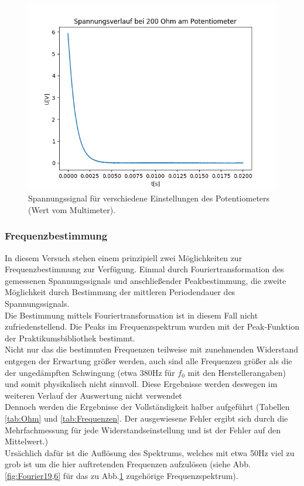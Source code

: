 \documentclass[12pt,a4paper]{article}
\begin{document}
\begin{figure}
\begin{center}
\includegraphics[scale=0.5]{Bilder/Spannungsverlauf200}
\end{center}
\caption[Spannungsverlauf]{Spannungssignal für verschiedene Einstellungen des Potentiometers (Wert vom Multimeter).}
\label{fig:Spannung19,6}
\end{figure}



\subsubsection{Frequenzbestimmung}
In diesem Versuch stehen einem prinzipiell zwei Möglichkeiten zur Frequenzbestimmung zur Verfügung.
Einmal durch Fouriertransformation des gemessenen Spannungssignals und anschließender Peakbestimmung, die zweite Möglichkeit durch Bestimmung der mittleren Periodendauer des Spannungssignals.\\


Die Bestimmung mittels Fouriertransformation ist in diesem Fall nicht zufriedenstellend. Die Peaks im Frequenzspektrum wurden mit der Peak-Funktion der Praktikumsbibliothek bestimmt.\\
Nicht nur das die bestimmten Frequenzen teilweise mit zunehmenden Widerstand entgegen der Erwartung größer werden, auch sind alle Frequenzen größer als die der ungedämpften Schwingung (etwa 380Hz für $f_0$ mit den Herstellerangaben) und somit physikalisch nicht sinnvoll. Diese Ergebnisse werden deswegen im weiteren Verlauf der Auswertung nicht verwendet\\
Dennoch werden die Ergebnisse der Vollständigkeit halber aufgeführt (Tabellen \ref{tab:Ohm} und 
\ref{tab:Frequenzen}. Der ausgewiesene Fehler ergibt sich durch die Mehrfachmessung für jede Widerstandseinstellung und ist der Fehler auf den Mittelwert.)\\
Ursächlich dafür ist die Auflösung des Spektrums, welches mit etwa 50Hz viel zu grob ist um die hier auftretenden Frequenzen aufzulösen (siehe Abb.\ref{fig:Fourier19,6} für das zu Abb.\ref{fig:Spannung19,6} zugehörige Frequenzspektrum).\\
\end{document}
